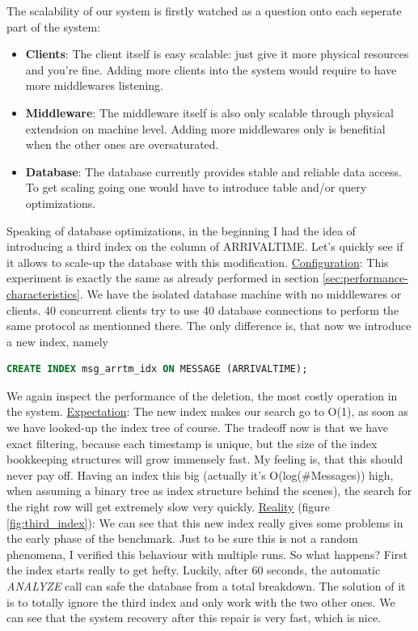 \documentclass[11pt]{article}
\begin{document}
The scalability of our system is firstly watched as a question onto each seperate part of the system:
\begin{itemize}
	\item \textbf{Clients}: The client itself is easy scalable: just give it more physical resources and you're fine. Adding more clients into the system would require to have more middlewares listening.
	\item \textbf{Middleware}: The middleware itself is also only scalable through physical extendsion on machine level. Adding more middlewares only is benefitial when the other ones are oversaturated.
	\item \textbf{Database}: The database currently provides stable and reliable data access. To get scaling going one would have to introduce table and/or query optimizations.
\end{itemize}
Speaking of database optimizations, in the beginning I had the idea of introducing a third index on the column of ARRIVALTIME. Let's quickly see if it allows to scale-up the database with this modification.
\newline\underline{Configuration}: This experiment is exactly the same as already performed in section \ref{sec:performance-characteristics}. We have the isolated database machine with no middlewares or clients. 40 concurrent clients try to use 40 database connections to perform the same protocol as mentionned there. The only difference is, that now we introduce a new index, namely
\begin{lstlisting}[language=SQL,basicstyle=\small]
CREATE INDEX msg_arrtm_idx ON MESSAGE (ARRIVALTIME);
\end{lstlisting}
We again inspect the performance of the deletion, the most costly operation in the system.
\underline{Expectation}: The new index makes our search go to O(1), as soon as we have looked-up the index tree of course. The tradeoff now is that we have exact filtering, because each timestamp is unique, but the size of the index bookkeeping structures will grow immensely fast. My feeling is, that this should never pay off. Having an index this big (actually it's O(log(\#Messages)) high, when assuming a binary tree as index structure behind the scenes), the search for the right row will get extremely slow very quickly.
\newline\underline{Reality} (figure \ref{fig:third_index}): We can see that this new index really gives some problems in the early phase of the benchmark. Just to be sure this is not a random phenomena, I verified this behaviour with multiple runs. So what happens? First the index starts really to get hefty. Luckily, after 60 seconds, the automatic \textit{ANALYZE} call can safe the database from a total breakdown. The solution of it is to totally ignore the third index and only work with the two other ones. We can see that the system recovery after this repair is very fast, which is nice.
\end{document}
